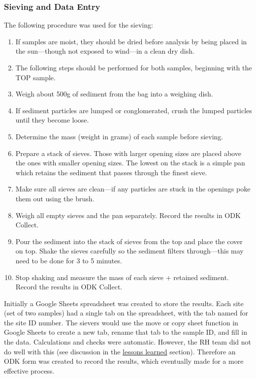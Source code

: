\documentclass[a4paper,12pt,twoside]{article}
\begin{document}
\newpage
\color{RHblue}
\subsubsection{Sieving and Data Entry}
\color{RHgrey}
The following procedure was used for the sieving:

\begin{enumerate}
  \item If samples are moist, they should be dried before analysis by being placed in the sun---though not exposed to wind---in a clean dry dish. 
  \item The following steps should be performed for both samples, beginning with the TOP sample.
  \item Weigh about 500g of sediment from the bag into a weighing dish.
  \item If sediment particles are lumped or conglomerated, crush the lumped particles until they become loose.
  \item Determine the mass (weight in grams) of each sample before sieving.
  \item Prepare a stack of sieves. Those with larger opening sizes are placed above the ones with smaller opening sizes. The lowest on the stack is a simple pan which retains the sediment that passes through the finest sieve.
  \item Make sure all sieves are clean---if any particles are stuck in the openings poke them out using the brush.
  \item Weigh all empty sieves and the pan separately. Record the results in ODK Collect.
  \item Pour the sediment into the stack of sieves from the top and place the cover on top. Shake the sieves carefully so the sediment filters through---this may need to be done for 3 to 5 minutes.
  \item Stop shaking and measure the mass of each sieve + retained sediment. Record the results in ODK Collect.
\end{enumerate}

Initially a Google Sheets spreadsheet was created to store the results. Each site (set of two samples) had a single tab on the spreadsheet, with the tab named for the site ID number. The sievers would use the move or copy sheet function in Google Sheets to create a new tab, rename that tab to the sample ID, and fill in the data. Calculations and checks were automatic. However, the RH team did not do well with this (see discussion in the \hyperlink{lessonslearned}{lessons learned} section). Therefore an ODK form was created to record the results, which eventually made for a more effective process. 
\end{document}
